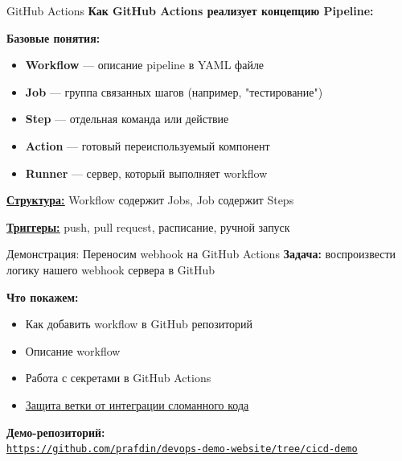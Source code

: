 \documentclass[aspectratio=169]{beamer}
\begin{document}
    \begin{frame}{GitHub Actions}
        \textbf{Как GitHub Actions реализует концепцию Pipeline:}
        
        \vspace{0.5cm}
        
        \textbf{Базовые понятия:}
        \begin{itemize}
            \item \textbf{Workflow} — описание pipeline в YAML файле
            \item \textbf{Job} — группа связанных шагов (например, "тестирование")
            \item \textbf{Step} — отдельная команда или действие
            \item \textbf{Action} — готовый переиспользуемый компонент
            \item \textbf{Runner} — сервер, который выполняет workflow
        \end{itemize}
        
        \vspace{0.2cm}

        \href{https://docs.github.com/en/actions/reference/workflows-and-actions/workflow-syntax}{\textbf{\underline{Структура:}}} Workflow содержит Jobs, Job содержит Steps

        \vspace{0.2cm}

        \href{https://docs.github.com/en/actions/reference/workflows-and-actions/events-that-trigger-workflows}{\textbf{\underline{Триггеры:}}} push, pull request, расписание, ручной запуск
    \end{frame}

    \begin{frame}{Демонстрация: Переносим webhook на GitHub Actions}
        \textbf{Задача:} воспроизвести логику нашего webhook сервера в GitHub

        
        \vspace{0.3cm}
        
        \textbf{Что покажем:}
        \begin{itemize}
            \item Как добавить workflow в GitHub репозиторий
            \item Описание workflow
            \item Работа с секретами в GitHub Actions
            \item \href{https://github.com/prafdin/devops-demo-website/settings/rules}{Защита ветки от интеграции сломанного кода}
        \end{itemize}

        \vspace{0.2cm}
        \textbf{Демо-репозиторий:} \\
        \href{https://github.com/prafdin/devops-demo-website/tree/cicd-demo}{\texttt{https://github.com/prafdin/devops-demo-website/tree/cicd-demo}}
    \end{frame}
\end{document}
